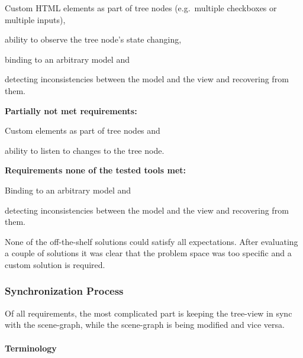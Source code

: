 \begin{enumerate*}
  \item Custom \gls{HTML} elements as part of tree nodes (e.g.~multiple checkboxes or multiple inputs),
  \item ability to observe the tree node's state changing,
  \item binding to an arbitrary model and
  \item detecting inconsistencies between the model and the view and recovering from them.
\end{enumerate*}

\textbf{Partially not met requirements:}

\begin{itemize*}
  \item Custom elements as part of tree nodes and
  \item ability to listen to changes to the tree node.
\end{itemize*}

\textbf{Requirements none of the tested tools met:}

\begin{itemize*}
  \item Binding to an arbitrary model and
  \item detecting inconsistencies between the model and the view and recovering from them.
\end{itemize*}

None of the off-the-shelf solutions could satisfy all expectations. After
evaluating a couple of solutions it was clear that the problem space was too
specific and a custom solution is required.

\subsubsection{Synchronization Process}

Of all requirements, the most complicated part is keeping the tree-view in sync
with the scene-graph, while the scene-graph is being modified and vice
versa.

\paragraph{Terminology}
\label{terminology}

